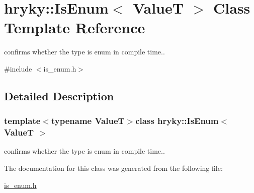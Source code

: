 \hypertarget{classhryky_1_1_is_enum}{\section{hryky\-:\-:Is\-Enum$<$ Value\-T $>$ Class Template Reference}
\label{classhryky_1_1_is_enum}
}


confirms whether the type is enum in compile time..  




{\ttfamily \#include $<$is\-\_\-enum.\-h$>$}



\subsection{Detailed Description}
\subsubsection*{template$<$typename Value\-T$>$class hryky\-::\-Is\-Enum$<$ Value\-T $>$}

confirms whether the type is enum in compile time.. 

The documentation for this class was generated from the following file\-:\begin{DoxyCompactItemize}
\item 
\hyperlink{is__enum_8h}{is\-\_\-enum.\-h}\end{DoxyCompactItemize}
